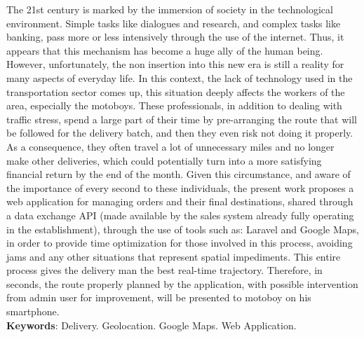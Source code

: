 
\begin{resumo}[ABSTRACT]
\begin{SingleSpacing}


The 21st century is marked by the immersion of society in the technological environment. Simple tasks like dialogues and research, and complex tasks like banking, pass more or less intensively through the use of the internet. Thus, it appears that this mechanism has become a huge ally of the human being. However, unfortunately, the non insertion into this new era is still a reality for many aspects of everyday life. In this context, the lack of technology used in the transportation sector comes up, this situation deeply affects the workers of the area, especially the motoboys. These professionals, in addition to dealing with traffic stress, spend a large part of their time by pre-arranging the route that will be followed for the delivery batch, and then they even risk not doing it properly. As a consequence, they often travel a lot of unnecessary miles and no longer make other deliveries, which could potentially turn into a more satisfying financial return by the end of the month. Given this circumstance, and aware of the importance of every second to these individuals, the present work proposes a web application for managing orders and their final destinations, shared through a data exchange API (made available by the sales system already fully operating in the establishment), through the use of tools such as: Laravel and Google Maps, in order to provide time optimization for those involved in this process, avoiding jams and any other situations that represent spatial impediments. This entire process gives the delivery man the best real-time trajectory. Therefore, in seconds, the route properly planned by the application, with possible intervention from admin user for improvement, will be presented to motoboy on his smartphone. \\

\textbf{Keywords}: Delivery. Geolocation. Google Maps. Web Application.

\end{SingleSpacing}
\end{resumo}